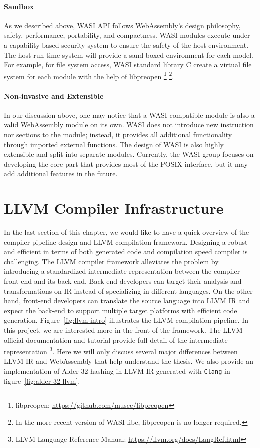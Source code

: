 \paragraph{Sandbox}
As we described above, WASI API follows WebAssembly's design philosophy, safety, performance, portability, and compactness. WASI modules execute under a capability-based security system to ensure the safety of the host environment. The host run-time system will provide a sand-boxed environment for each model. For example, for file system access, WASI standard library C create a virtual file system for each module with the help of libpreopen \footnote{libpreopen: \url{https://github.com/musec/libpreopen}} \footnote{In the more recent version of WASI libc, libpreopen is no longer required.}.

\paragraph{Non-invasive and Extensible}
In our discussion above, one may notice that a WASI-compatible module is also a valid WebAssembly module on its own. WASI does not introduce new instruction nor sections to the module; instead, it provides all additional functionality through imported external functions. The design of WASI is also highly extensible and split into separate modules. Currently, the WASI group focuses on developing the core part that provides most of the POSIX interface, but it may add additional features in the future.

\section{LLVM Compiler Infrastructure}

In the last section of this chapter, we would like to have a quick overview of the compiler pipeline design and LLVM compilation framework. Designing a robust and efficient in terms of both generated code and compilation speed compiler is challenging. The LLVM compiler framework \cite{llvm-thesis} alleviates the problem by introducing a standardized intermediate representation between the compiler front end and its back-end. Back-end developers can target their analysis and transformations on IR instead of specializing in different languages. On the other hand, front-end developers can translate the source language into LLVM IR and expect the back-end to support multiple target platforms with efficient code generation. Figure~\ref{fig:llvm-intro} illustrates the LLVM compilation pipeline. In this project, we are interested more in the front of the framework. The LLVM official documentation and tutorial provide full detail of the intermediate representation \footnote{LLVM Language Reference Manual: \url{https://llvm.org/docs/LangRef.html}}. Here we will only discuss several major differences between LLVM IR and WebAssembly that help understand the thesis. We also provide an implementation of Alder-32 hashing in LLVM IR generated with \texttt{Clang} in figure~\ref{fig:alder-32-llvm}.

